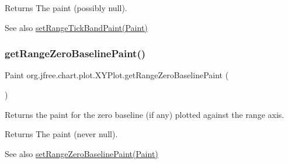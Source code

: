 \begin{DoxyReturn}{Returns}
The paint (possibly {\ttfamily null}).
\end{DoxyReturn}
\begin{DoxySeeAlso}{See also}
\mbox{\hyperlink{classorg_1_1jfree_1_1chart_1_1plot_1_1_x_y_plot_a83d3ff283ef61b61af7cd9669194f8e7}{set\+Range\+Tick\+Band\+Paint(\+Paint)}} 
\end{DoxySeeAlso}
\mbox{\label{classorg_1_1jfree_1_1chart_1_1plot_1_1_x_y_plot_ae0e06c4efef9b49e9c8e945f1451a991}} 
\subsubsection{\texorpdfstring{get\+Range\+Zero\+Baseline\+Paint()}{getRangeZeroBaselinePaint()}}
{\footnotesize\ttfamily Paint org.\+jfree.\+chart.\+plot.\+X\+Y\+Plot.\+get\+Range\+Zero\+Baseline\+Paint (\begin{DoxyParamCaption}{ }\end{DoxyParamCaption})}

Returns the paint for the zero baseline (if any) plotted against the range axis.

\begin{DoxyReturn}{Returns}
The paint (never {\ttfamily null}).
\end{DoxyReturn}
\begin{DoxySeeAlso}{See also}
\mbox{\hyperlink{classorg_1_1jfree_1_1chart_1_1plot_1_1_x_y_plot_a0f5bd5185f2a8171cf30473aa89fe1b7}{set\+Range\+Zero\+Baseline\+Paint(\+Paint)}} 
\end{DoxySeeAlso}
\mbox{\label{classorg_1_1jfree_1_1chart_1_1plot_1_1_x_y_plot_a4e1e66786df0c680c395061558176470}} 
